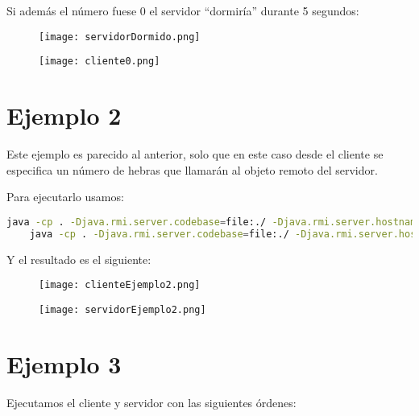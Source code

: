 Si además el número fuese 0 el servidor ``dormiría'' durante 5 segundos:

\begin{figure}[!ht]
	\begin{center}
		\texttt{[image: servidorDormido.png]}
	\end{center}
\end{figure}
\begin{figure}[!ht]
	\begin{center}
		\texttt{[image: cliente0.png]}
	\end{center}
\end{figure}

\section{Ejemplo 2}

Este ejemplo es parecido al anterior, solo que en este caso desde el cliente se especifica
un número de hebras que llamarán al objeto remoto del servidor.

Para ejecutarlo usamos:

\begin{lstlisting}[language=sh]
	java -cp . -Djava.rmi.server.codebase=file:./ -Djava.rmi.server.hostname=localhost -Djava.security.policy=server.policy ejemplo2.Ejemplo
	java -cp . -Djava.rmi.server.codebase=file:./ -Djava.rmi.server.hostname=localhost -Djava.security.policy=server.policy ejemplo2.Cliente_Ejemplo_Multi_Thread localhost 5
\end{lstlisting}

Y el resultado es el siguiente:

\begin{figure}[!ht]
	\begin{center}
		\texttt{[image: clienteEjemplo2.png]}
	\end{center}
\end{figure}

\begin{figure}[!ht]
	\begin{center}
		\texttt{[image: servidorEjemplo2.png]}
	\end{center}
\end{figure}

\section{Ejemplo 3}

Ejecutamos el cliente y servidor con las siguientes órdenes:

